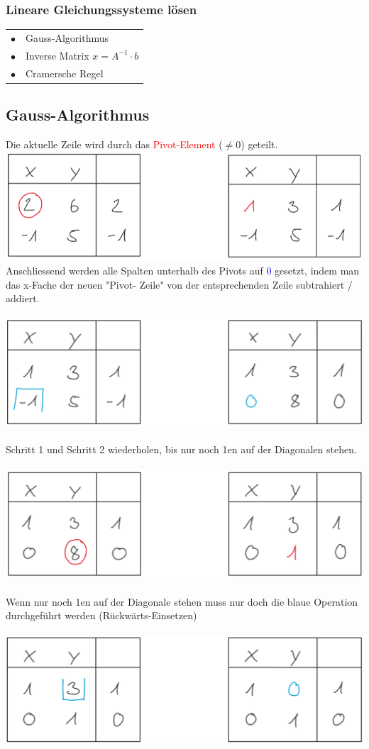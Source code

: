 			 
			 \subsubsection{Lineare Gleichungssysteme lösen}
			 \begin{tabular}{ll}
			 $\bullet$ & Gauss-Algorithmus \\
			 $\bullet$ & Inverse Matrix $x = A^{-1} \cdot b$ \\
			 $\bullet$ & Cramersche Regel \\
			 \end{tabular}
			 
			 
		    \subsection{Gauss-Algorithmus}
		    Die aktuelle Zeile wird durch das \textcolor{red}{Pivot-Element} ($\neq 0$) geteilt. \\  
		     \includegraphics[width=0.45\linewidth]{Bilder/gauss1} \\
		   	

		    Anschliessend werden alle Spalten unterhalb des Pivots auf \textcolor{blue}0 gesetzt, indem man das x-Fache der neuen "Pivot- Zeile" von der entsprechenden Zeile subtrahiert / addiert. \\
		    \\
		    \includegraphics[width=0.45\linewidth]{Bilder/gauss2} \\
		    \\
		    Schritt 1 und Schritt 2 wiederholen, bis nur noch 1en auf der Diagonalen stehen. \\
		    \\
		    \includegraphics[width=0.45\linewidth]{Bilder/gauss3} \\
		    \\
		    Wenn nur noch 1en auf der Diagonale stehen muss nur doch die blaue Operation durchgeführt werden (Rückwärts-Einsetzen) \\
		    \\
		    \includegraphics[width=0.45\linewidth]{Bilder/gauss4} \\
		    
